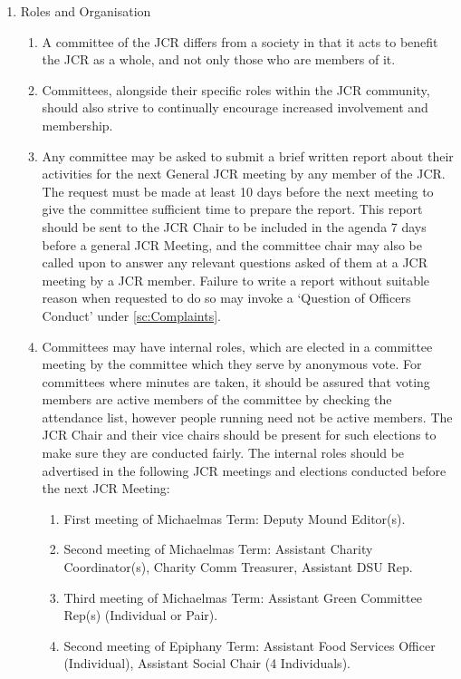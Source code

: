 \begin{enumerate}
    \item Roles and Organisation
    \begin{enumerate}
        \item A committee of the JCR differs from a society in that it acts to benefit the JCR as a whole, and not only those who are members of it.
        \item Committees, alongside their specific roles within the JCR community, should also strive to continually encourage increased involvement and membership.
        \item Any committee may be asked to submit a brief written report about their activities for the next General JCR meeting by any member of the JCR. The request must be made at least 10 days before the next meeting to give the committee sufficient time to prepare the report. This report should be sent to the JCR Chair to be included in the agenda 7 days before a general JCR Meeting, and the committee chair may also be called upon to answer any relevant questions asked of them at a JCR meeting by a JCR member. Failure to write a report without suitable reason when requested to do so may invoke a ‘Question of Officers Conduct’ under \ref{sc:Complaints}.
        \item Committees may have internal roles, which are elected in a committee meeting by the committee which they serve by anonymous vote. For committees where minutes are taken, it should be assured that voting members are active members of the committee by checking the attendance list, however people running need not be active members. The JCR Chair and their vice chairs should be present for such elections to make sure they are conducted fairly. The internal roles should be advertised in the following JCR meetings and elections conducted before the next JCR Meeting:
        \begin{enumerate}
            \item First meeting of Michaelmas Term: Deputy Mound Editor(s).
            \item Second meeting of Michaelmas Term: Assistant Charity Coordinator(s), Charity Comm
            Treasurer, Assistant DSU Rep.
            \item Third meeting of Michaelmas Term: Assistant Green Committee Rep(s) (Individual or Pair).
            \item Second meeting of Epiphany Term: Assistant Food Services Officer (Individual), Assistant Social Chair (4 Individuals).

\end{enumerate}
\end{enumerate}
\end{enumerate}
